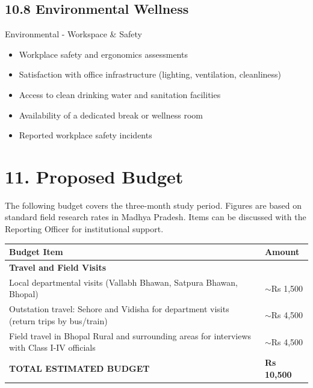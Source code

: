 \documentclass[11pt,a4paper]{article}
\begin{document}
\subsection{10.8 Environmental Wellness}
\begin{defbox}{Environmental - Workspace \& Safety}
\begin{itemize}
  \item Workplace safety and ergonomics assessments
  \item Satisfaction with office infrastructure (lighting, ventilation, cleanliness)
  \item Access to clean drinking water and sanitation facilities
  \item Availability of a dedicated break or wellness room
  \item Reported workplace safety incidents
\end{itemize}
\end{defbox}

\section{11. Proposed Budget}
\vspace{0.2cm}
The following budget covers the three-month study period. Figures are based on standard field research rates in Madhya Pradesh. Items can be discussed with the Reporting Officer for institutional support.

\begin{center}
\renewcommand{\arraystretch}{1.3}
\begin{tabularx}{\textwidth}{|X|l|}
\hline
\textbf{Budget Item} & \textbf{Amount} \\
\hline
\textbf{Travel and Field Visits} & \\
\hline
Local departmental visits (Vallabh Bhawan, Satpura Bhawan, Bhopal) & $\sim$Rs 1,500 \\
\hline
Outstation travel: Sehore and Vidisha for department visits (return trips by bus/train) & $\sim$Rs 4,500 \\
\hline
Field travel in Bhopal Rural and surrounding areas for interviews with Class I-IV officials & $\sim$Rs 4,500 \\
\hline
\textbf{TOTAL ESTIMATED BUDGET} & \textbf{Rs 10,500} \\
\hline
\end{tabularx}
\end{center}

\newpage
\end{document}
